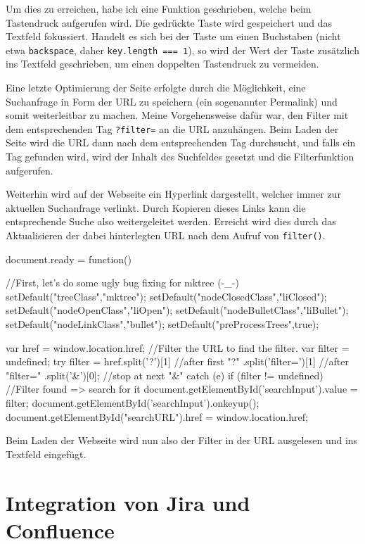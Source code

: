 \documentclass[xcolor=dvipsnames,11pt,paper=a4paper]{report}
\begin{document}
Um dies zu erreichen, habe ich eine Funktion geschrieben, welche beim Tastendruck
aufgerufen wird. Die gedrückte Taste wird gespeichert und das Textfeld fokussiert.
Handelt es sich bei der Taste um einen Buchstaben (nicht etwa \texttt{backspace},
daher \texttt{key.length === 1}), so wird der Wert der Taste zusätzlich ins Textfeld
geschrieben, um einen doppelten Tastendruck zu vermeiden.

Eine letzte Optimierung der Seite erfolgte durch die Möglichkeit, eine Suchanfrage
in Form der URL zu speichern (ein sogenannter Permalink) und somit weiterleitbar
zu machen. Meine Vorgehensweise dafür war, den Filter mit dem entsprechenden Tag
\texttt{?filter=} an die URL anzuhängen. Beim Laden der Seite wird die URL dann
nach dem entsprechenden Tag durchsucht, und falls ein Tag gefunden wird, wird der
Inhalt des Suchfeldes gesetzt und die Filterfunktion aufgerufen.

Weiterhin wird auf der Webseite ein Hyperlink dargestellt, welcher immer zur aktuellen
Suchanfrage verlinkt. Durch Kopieren dieses Links kann die entsprechende Suche also
weitergeleitet werden. Erreicht wird dies durch das Aktualisieren der dabei hinterlegten
URL nach dem Aufruf von \texttt{filter()}.

\begin{code}[language=javascript, caption={Filterung beim Laden der Seite}]
document.ready = function() {
	//First, let's do some ugly bug fixing for mktree (-_-)
	setDefault("treeClass","mktree");
	setDefault("nodeClosedClass","liClosed");
	setDefault("nodeOpenClass","liOpen");
	setDefault("nodeBulletClass","liBullet");
	setDefault("nodeLinkClass","bullet");
	setDefault("preProcessTrees",true);

	var href = window.location.href;
	//Filter the URL to find the filter.
	var filter = undefined;
	try {
		filter =	href.split('?')[1] //after first "?"
							.split('filter=')[1] //after "filter="
							.split('&')[0]; //stop at next "&"
	} catch (e) {}
	if (filter != undefined) {
		//Filter found => search for it
		document.getElementById('searchInput').value = filter;
		document.getElementById('searchInput').onkeyup();
	}
	document.getElementById("searchURL").href = window.location.href;
}
\end{code}

Beim Laden der Webseite wird nun also der Filter in der URL ausgelesen und ins Textfeld
eingefügt.




\chapter{Integration von Jira und Confluence}
\end{document}
